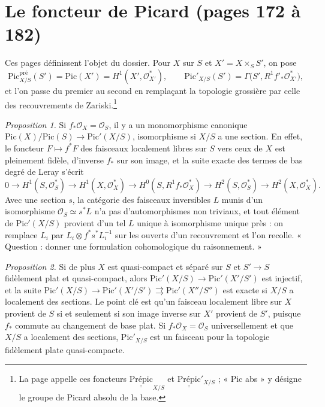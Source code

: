 \documentclass[11pt,a4paper]{article}
\begin{document}
\section*{Le foncteur de Picard (pages 172 à 182)}

Ces pages définissent l'objet du dossier. Pour $X$ sur $S$ et
$X' = X \times_S S'$, on pose
\[
\mathrm{Pic}^{\mathrm{pré}}_{X/S}(S') = \mathrm{Pic}(X') = H^1(X', \mathcal{O}^*_{X'}),
\qquad
\mathrm{Pic}'_{X/S}(S') = \Gamma\bigl(S', R^1 f'_*\mathcal{O}^*_{X'}\bigr) ,
\]
et l'on passe du premier au second en remplaçant la topologie grossière par
celle des recouvrements de Zariski.\footnote{La page appelle ces foncteurs
$\underline{\underline{\text{Prépic}}}_{X/S}$ et
$\underline{\underline{\text{Prépic}}}'_{X/S}$ ; « Pic abs » y désigne le
groupe de Picard absolu de la base.}

\emph{Proposition 1.} Si $f_*\mathcal{O}_X = \mathcal{O}_S$, il y a un
monomorphisme canonique $\mathrm{Pic}(X)/\mathrm{Pic}(S) \to \mathrm{Pic}'(X/S)$,
isomorphisme si $X/S$ a une section. En effet, le foncteur $F \mapsto f^*F$
des faisceaux localement libres sur $S$ vers ceux de $X$ est pleinement
fidèle, d'inverse $f_*$ sur son image, et la suite exacte des termes de bas
degré de Leray s'écrit
\[
0 \to H^1(S, \mathcal{O}^*_S) \to H^1(X, \mathcal{O}^*_X) \to H^0(S, R^1 f_*\mathcal{O}^*_X) \to H^2(S, \mathcal{O}^*_S) \to H^2(X, \mathcal{O}^*_X) .
\]
Avec une section $s$, la catégorie des faisceaux inversibles $L$ munis d'un
isomorphisme $\mathcal{O}_S \simeq s^*L$ n'a pas d'automorphismes non triviaux,
et tout élément de $\mathrm{Pic}'(X/S)$ provient d'un tel $L$ unique à
isomorphisme unique près : on remplace $L_i$ par
$L_i \otimes f^*s^*L_i^{-1}$ sur les ouverts d'un recouvrement et l'on recolle.
« Question : donner une formulation cohomologique du raisonnement. »

\emph{Proposition 2.} Si de plus $X$ est quasi-compact et séparé sur $S$ et
$S' \to S$ fidèlement plat et quasi-compact, alors
$\mathrm{Pic}'(X/S) \to \mathrm{Pic}'(X'/S')$ est injectif, et la suite
$\mathrm{Pic}'(X/S) \to \mathrm{Pic}'(X'/S') \rightrightarrows \mathrm{Pic}'(X''/S'')$
est exacte si $X/S$ a localement des sections. Le point clé est qu'un faisceau
localement libre sur $X$ provient de $S$ si et seulement si son image inverse
sur $X'$ provient de $S'$, puisque $f_*$ commute au changement de base plat.
Si $f_*\mathcal{O}_X = \mathcal{O}_S$ universellement et que $X/S$ a localement
des sections, $\mathrm{Pic}'_{X/S}$ est un faisceau pour la topologie
fidèlement plate quasi-compacte.
\end{document}
